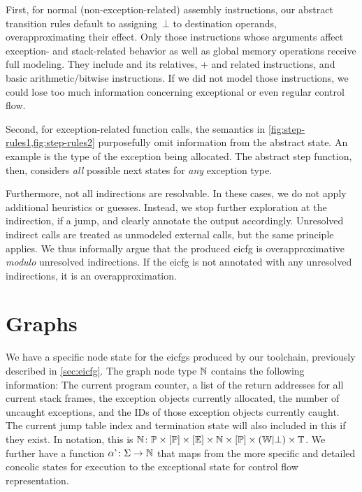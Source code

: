 First, for normal (non-exception-related) assembly instructions, our abstract transition rules default to assigning~$\bot$ to destination operands, overapproximating their effect.
Only those instructions whose arguments affect exception- and stack-related behavior as well as global memory operations receive full modeling.
They include  and its relatives, + and related instructions, and basic arithmetic/bitwise instructions.
If we did not model those instructions, we could lose too much information concerning exceptional or even regular control flow.

Second, for exception-related function calls, the semantics in \cref{fig:step-rules1,fig:step-rules2} purposefully omit information from the abstract state.
An example is the type of the exception being allocated.
The abstract step function, then, considers \emph{all} possible next states for \emph{any} exception type.

Furthermore, not all indirections are resolvable.
In these cases, we do not apply additional heuristics or guesses.
Instead, we stop further exploration at the indirection, if a jump, and clearly annotate the output accordingly.
Unresolved indirect calls are treated as unmodeled external calls, but the same principle applies.
We thus informally argue that the produced \ac{eicfg} is overapproximative \emph{modulo} unresolved indirections.
If the \ac{eicfg} is not annotated with any unresolved indirections, it is an overapproximation. %

\section{Graphs}
We have a specific node state for the \acp{eicfg} produced by our toolchain,
previously described in \cref{sec:eicfg}.
The graph node type $\mathbb N$ contains the following information:
The current program counter,
a list of the return addresses for all current stack frames,
the exception objects currently allocated,
the number of uncaught exceptions,
and the IDs of those exception objects currently caught.
The current jump table index and termination state will also included in this if they exist. In notation, this is
$\mathbb N\colon\mathbb P\times[\mathbb P]\times[\mathbb E]\times\mathbb N\times[\mathbb P]\times(\mathbb W|\bot)\times\mathbb T$.
We further have a function $\operatorname{\alpha'}\colon\Sigma\rightarrow\mathbb N$
that maps from the more specific and detailed concolic states for execution
to the exceptional state for control flow representation.

